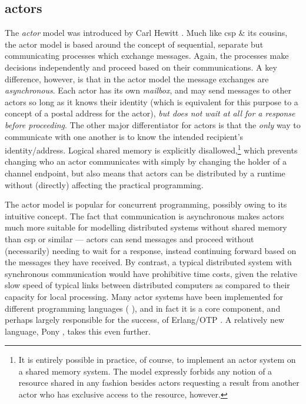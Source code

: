 \subsection{\label{subsec:lr:actors}\texorpdfstring{\Glspl{actor}}{Actors}}
The \emph{\gls{actor}} \cite{Agha1986,Agha1997} model was introduced by Carl Hewitt \cite{Hewitt1973}.  Much like \gls{csp} \& its cousins, the \gls{actor} model is based around the concept of sequential, separate but communicating processes which exchange messages.  Again, the processes make decisions independently and proceed based on their communications.  A key difference, however, is that in the \gls{actor} model the message exchanges are \emph{asynchronous}.  Each \gls{actor} has its own \emph{mailbox}, and may send messages to other \glspl{actor} so long as it knows their identity (which is equivalent for this purpose to a concept of a postal address for the \gls{actor}), \emph{but does not wait at all for a response before proceeding}.  The other major differentiator for \glspl{actor} is that the \emph{only} way to communicate with one another is to know the intended recipient's identity/address.  Logical shared memory is explicitly disallowed,\footnote{It is entirely possible in practice, of course, to implement an \gls{actor} system on a shared memory system.  The model expressly forbids any notion of a resource shared in any fashion besides \glspl{actor} requesting a result from another \gls{actor} who has exclusive access to the resource, however.} which prevents changing who an \gls{actor} communicates with simply by \eg{} changing the holder of a channel endpoint, but also means that actors can be distributed by a runtime without (directly) affecting the practical programming.

The \gls{actor} model is popular for concurrent programming, possibly owing to its intuitive concept.  The fact that communication is asynchronous makes \glspl{actor} much more suitable for modelling distributed systems without shared memory than \gls{csp} or similar --- \glspl{actor} can send messages and proceed without (necessarily) needing to wait for a response, instead continuing forward based on the messages they have received.  By contrast, a typical distributed system with synchronous communication would have prohibitive time costs, given the relative slow speed of typical links between distributed computers as compared to their capacity for local processing.  Many \gls{actor} systems have been implemented for different programming languages (\eg{} \cite{Varela2001,Srinivasan2008,Charousset2016,Bernstein2016}), and in fact it is a core component, and perhaps largely responsible for the success, of Erlang/OTP \cite{Armstrong2010,Armstrong2013,Vinoski2012}.  A relatively new language, Pony \cite{Clebsch2015,Clebsch2017}, takes this even further.

